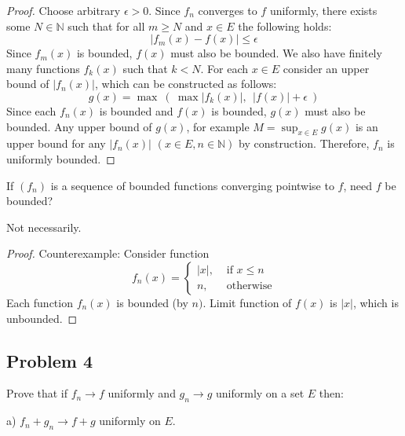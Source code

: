 \documentclass{article}
\newcommand{\N}{\mathbb{N}}
\begin{document}
\begin{proof}

Choose arbitrary $\epsilon>0$. Since $f_n$ converges to $f$  uniformly, there exists some $N \in \N$ such that for all $m \geq N$ and $x \in E$ the following holds:
\[ |f_m(x)-f(x)| \leq \epsilon \]
Since $f_m(x)$ is bounded, $f(x)$ must also be bounded.
We also have finitely many functions $f_k(x)$ such that $k<N$.
For each $x \in E$ consider an upper bound of $|f_n(x)|$, which can be constructed as follows:
\[ g(x) = \max \> ( \> \max |f_k(x)|, \>\> |f(x)| + \epsilon \> ) \]
Since each $f_n(x)$ is bounded and $f(x)$ is bounded, $g(x)$ must also be bounded.
Any upper bound of $g(x)$, for example $M = \sup_{x\in E} g(x)$ is an upper bound for any $|f_n(x)|$ $(x \in E, n \in \N)$ by construction. 
Therefore, $f_n$ is uniformly bounded.

\end{proof}

\begin{tcolorbox}
If $(f_n)$ is a sequence of bounded functions converging pointwise to $f$, need $f$ be bounded?
\end{tcolorbox}

Not necessarily.

\begin{proof}

Counterexample: Consider function
\[
    f_n(x) =
    \begin{cases}
        |x|, & \text{ if $x \leq n$} \\
        n, & \text{ otherwise}
    \end{cases}
\]
Each function $f_n(x)$ is bounded (by $n)$.
Limit function of $f(x)$ is $|x|$, which is unbounded.

\end{proof}


\subsection*{Problem 4}

\begin{tcolorbox}
Prove that if $f_n \to f$ uniformly and $g_n \to g$ uniformly on a set $E$ then:

a) $f_n + g_n \to f + g$ uniformly on $E$.
\end{tcolorbox}
\end{document}
